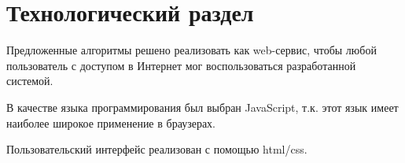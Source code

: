 \chapter{Технологический раздел}

Предложенные алгоритмы решено реализовать как web-сервис, чтобы любой пользователь с доступом в Интернет мог воспользоваться разработанной системой.

В качестве языка программирования был выбран JavaScript, т.к. этот язык имеет наиболее широкое применение в браузерах. 

Пользовательский интерфейс реализован с помощью html/css.